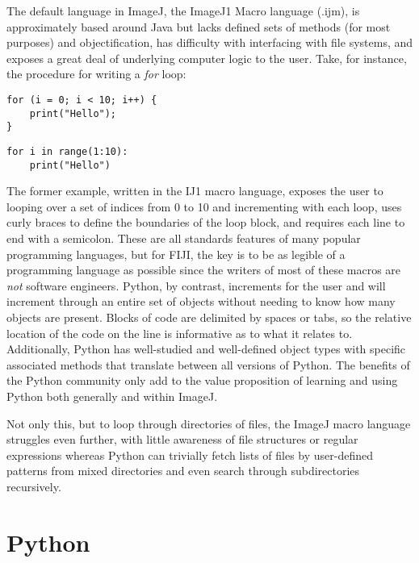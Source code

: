 The default language in ImageJ, the ImageJ1 Macro language (.ijm), is approximately based around Java but lacks defined sets of methods (for most purposes) and objectification, has difficulty with interfacing with file systems, and exposes a great deal of underlying computer logic to the user. Take, for instance, the procedure for writing a \textit{for} loop:

\begin{code}
\begin{verbatim}
for (i = 0; i < 10; i++) {
    print("Hello");
}
\end{verbatim}
\end{code}

\begin{code}
\begin{verbatim}
for i in range(1:10):
    print("Hello")
\end{verbatim}
\end{code}

The former example, written in the IJ1 macro language, exposes the user to looping over a set of indices from 0 to 10 and incrementing with each loop, uses curly braces to define the boundaries of the loop block, and requires each line to end with a semicolon. These are all standards features of many popular programming languages, but for FIJI, the key is to be as legible of a programming language as possible since the writers of most of these macros are \textit{not} software engineers. Python, by contrast, increments for the user and will increment through an entire set of objects without needing to know how many objects are present. Blocks of code are delimited by spaces or tabs, so the relative location of the code on the line is informative as to what it relates to. Additionally, Python has well-studied and well-defined object types with specific associated methods that translate between all versions of Python. The benefits of the Python community only add to the value proposition of learning and using Python both generally and within ImageJ.

Not only this, but to loop through directories of files, the ImageJ macro language struggles even further, with little awareness of file structures or regular expressions whereas Python can trivially fetch lists of files by user-defined patterns from mixed directories and even search through subdirectories recursively.
 
\section{Python}\label{python}

